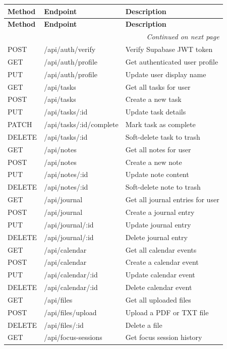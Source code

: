 \begin{longtable}{|l|l|p{6cm}|}
\hline
\textbf{Method} & \textbf{Endpoint} & \textbf{Description} \\
\hline
\endfirsthead
\hline
\textbf{Method} & \textbf{Endpoint} & \textbf{Description} \\
\hline
\endhead
\multicolumn{3}{r}{\textit{Continued on next page}} \\
\endfoot
\hline
\endlastfoot
POST & /api/auth/verify & Verify Supabase JWT token \\
GET & /api/auth/profile & Get authenticated user profile \\
PUT & /api/auth/profile & Update user display name \\
\hline
GET & /api/tasks & Get all tasks for user \\
POST & /api/tasks & Create a new task \\
PUT & /api/tasks/:id & Update task details \\
PATCH & /api/tasks/:id/complete & Mark task as complete \\
DELETE & /api/tasks/:id & Soft-delete task to trash \\
\hline
GET & /api/notes & Get all notes for user \\
POST & /api/notes & Create a new note \\
PUT & /api/notes/:id & Update note content \\
DELETE & /api/notes/:id & Soft-delete note to trash \\
\hline
GET & /api/journal & Get all journal entries for user \\
POST & /api/journal & Create a journal entry \\
PUT & /api/journal/:id & Update journal entry \\
DELETE & /api/journal/:id & Delete journal entry \\
\hline
GET & /api/calendar & Get all calendar events \\
POST & /api/calendar & Create a calendar event \\
PUT & /api/calendar/:id & Update calendar event \\
DELETE & /api/calendar/:id & Delete calendar event \\
\hline
GET & /api/files & Get all uploaded files \\
POST & /api/files/upload & Upload a PDF or TXT file \\
DELETE & /api/files/:id & Delete a file \\
\hline
GET & /api/focus-sessions & Get focus session history \\

\end{longtable}
